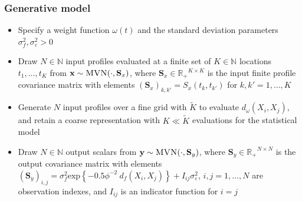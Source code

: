 \documentclass{snedecorbeamer}
\begin{document}
\begin{frame}%
  \label{frm:generative}
  \frametitle{Generative model}

  \begin{itemize}
  \item Specify a weight function $\omega(t)$ and the standard deviation
    parameters $\sigma_{f}^2,\sigma_{\varepsilon}^2 >0$
  \item Draw $N\in\mathbb{N}$ input profiles evaluated at a finite set of
    $K\in\mathbb{N}$ locations $t_1, \dots, t_K$ from
    $\mathbf{x}\sim\textsc{MVN}(\cdot, \mathbf{S}_x)$, where
    $\mathbf{S}_x\in{\mathbb{R}_+}^{K\times K}$ is the input finite profile
    covariance matrix with elements ${(\mathbf{S}_x)}_{k,k'} = S_x(t_k, t_{k'})$
    for $k,k' = 1, \dots, K$
  \item Generate $N$ input profiles over a fine grid with $\tilde{K}$ to
    evaluate $d_{\omega}(X_i, X_j)$, and retain a coarse
    representation with $K\ll\tilde{K}$ evaluations for the statistical model
  \item Draw $N\in\mathbb{N}$ output scalars from
    $\mathbf{y}\sim\textsc{MVN}(\cdot, \mathbf{S}_y)$, where
    $\mathbf{S}_y\in{\mathbb{R}_+}^{N\times N}$ is the output covariance matrix
    with elements ${(\mathbf{S}_y)}_{i,j} =
      \sigma_{f}^2 \text{exp}\left\{
      -0.5 \phi^{-2} \ d_f(X_i, X_j)
      \right\}
    + I_{ij}
    \sigma_{\varepsilon}^2$, $i,j = 1, \dots, N$ are observation indexes,
    and $I_{ij}$ is an indicator function for $i = j$
  \end{itemize}

\end{frame}
\end{document}
